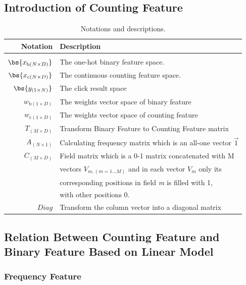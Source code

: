 \documentclass{sig-alternate}
\begin{document}
\subsection{Introduction of Counting Feature}
\begin{table}[t]
\center
\vspace{-5pt}
\caption{Notations and descriptions.}
\label{tab:notation-des}
\small
\begin{tabular}{rl}
Notation & Description\\
\hline
\\ [-2.0ex]
$\bs{x_{\text{b}(N\times D)}}$ & The one-hot binary feature space.\\
$\bs{x_{\text{c}(N\times D)}}$ & The continuous counting feature space.\\
$\bs{y_{(1\times N)}}$ & The click result space\\
$w_{\text{b}(1\times D)}$ & The weights vector space of binary feature\\
$w_{\text{c}(1\times D)}$ & The weights vector space of counting feature\\
$T_{(M\times D)}$ & Transform Binary Feature to Counting Feature matrix\\
$A_{(N\times 1)}$ & Calculating frequency matrix which is an all-one vector $\vec{1 }$\\
$C_{(M\times D)}$ & Field  matrix which is a 0-1 matrix concatenated with \textsl{}{M} \\
& vectors \(V_{m,(m = 1...M)}\) and in each vector \(V_m\) only its \\
& corresponding positions in field \textsl{m} is filled with 1, \\
& with other positions 0. \\
$Diag$ & Transform the column vector into a diagonal matrix
\end{tabular}
\end{table}

\subsection{Relation Between Counting Feature and Binary Feature Based on Linear Model}
\subsubsection{Frequency Feature}
\setlength{\parindent}{5ex}
\end{document}
